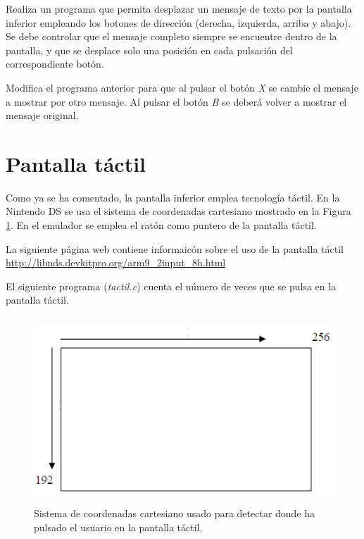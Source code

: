 \begin{exercise}
Realiza un programa que permita desplazar un mensaje de texto por la pantalla inferior empleando los botones de dirección (derecha, izquierda, arriba y abajo). Se debe controlar que el mensaje completo siempre se encuentre dentro de la pantalla, y que se desplace solo una posición en cada pulsación del correspondiente botón.
\end{exercise}

\begin{exercise}
Modifica el programa anterior para que al pulsar el botón \textit{X} se cambie el mensaje a mostrar por otro mensaje. Al pulsar el botón \textit{B} se deberá volver a mostrar el mensaje original.
\end{exercise}

\section{Pantalla táctil}
\label{sec_pantalla_tactil}
Como ya se ha comentado, la pantalla inferior emplea tecnología táctil. En la Nintendo DS se usa el  sistema de coordenadas cartesiano mostrado en la Figura \ref{fig_c3_cartesiano}. En el emulador se emplea el ratón como puntero de la pantalla táctil.

La siguiente página web contiene informaicón sobre el uso de la pantalla táctil  \url{http://libnds.devkitpro.org/arm9_2input_8h.html}

El siguiente programa (\textit{tactil.c}) cuenta el número de veces que se pulsa en la pantalla táctil.

\begin{figure}[t]
\centering
\includegraphics[height=7cm]{Figuras/C3/c3_coordenadas.png}
\caption{Sistema de coordenadas cartesiano usado para detectar donde ha pulsado el usuario en la pantalla táctil.}
\label{fig_c3_cartesiano}
\end{figure}

